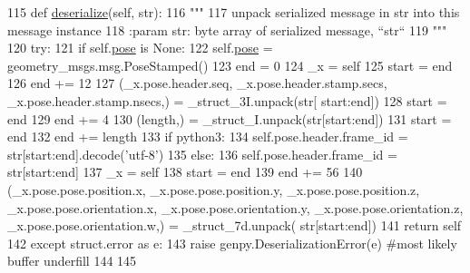 \begin{DoxyCode}
115   \textcolor{keyword}{def }\hyperlink{classjaco__msgs_1_1msg_1_1__ArmPoseGoal_1_1ArmPoseGoal_a5e943ea5b1dc04bb30487e5397a26e29}{deserialize}(self, str):
116     \textcolor{stringliteral}{"""}
117 \textcolor{stringliteral}{    unpack serialized message in str into this message instance}
118 \textcolor{stringliteral}{    :param str: byte array of serialized message, ``str``}
119 \textcolor{stringliteral}{    """}
120     \textcolor{keywordflow}{try}:
121       \textcolor{keywordflow}{if} self.\hyperlink{classjaco__msgs_1_1msg_1_1__ArmPoseGoal_1_1ArmPoseGoal_ad25889b3ba293b0eba280014befdc9a6}{pose} \textcolor{keywordflow}{is} \textcolor{keywordtype}{None}:
122         self.\hyperlink{classjaco__msgs_1_1msg_1_1__ArmPoseGoal_1_1ArmPoseGoal_ad25889b3ba293b0eba280014befdc9a6}{pose} = geometry\_msgs.msg.PoseStamped()
123       end = 0
124       \_x = self
125       start = end
126       end += 12
127       (\_x.pose.header.seq, \_x.pose.header.stamp.secs, \_x.pose.header.stamp.nsecs,) = \_struct\_3I.unpack(str[
      start:end])
128       start = end
129       end += 4
130       (length,) = \_struct\_I.unpack(str[start:end])
131       start = end
132       end += length
133       \textcolor{keywordflow}{if} python3:
134         self.pose.header.frame\_id = str[start:end].decode(\textcolor{stringliteral}{'utf-8'})
135       \textcolor{keywordflow}{else}:
136         self.pose.header.frame\_id = str[start:end]
137       \_x = self
138       start = end
139       end += 56
140       (\_x.pose.pose.position.x, \_x.pose.pose.position.y, \_x.pose.pose.position.z, 
      \_x.pose.pose.orientation.x, \_x.pose.pose.orientation.y, \_x.pose.pose.orientation.z, \_x.pose.pose.orientation.w,) = \_struct\_7d.unpack(
      str[start:end])
141       \textcolor{keywordflow}{return} self
142     \textcolor{keywordflow}{except} struct.error \textcolor{keyword}{as} e:
143       \textcolor{keywordflow}{raise} genpy.DeserializationError(e) \textcolor{comment}{#most likely buffer underfill}
144 
145 
\end{DoxyCode}
